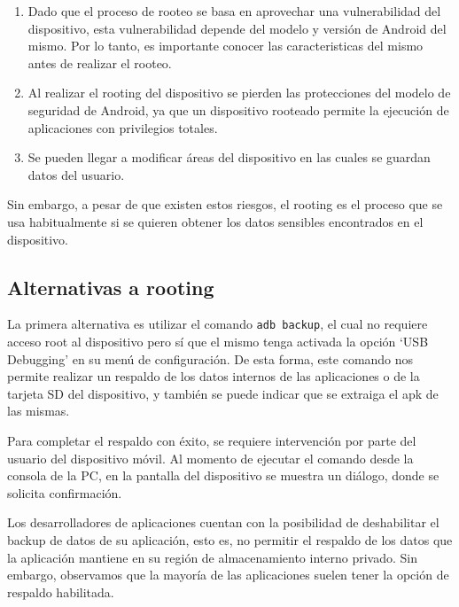 \begin{enumerate}[topsep=0pt, parsep=0pt, partopsep=0pt]
\item Dado que el proceso de rooteo se basa en aprovechar una vulnerabilidad del dispositivo, esta vulnerabilidad depende del modelo y versión de Android del mismo. Por lo tanto, es importante conocer las caracteristicas del mismo antes de realizar el rooteo.
\item Al realizar el rooting del dispositivo se pierden las protecciones del modelo de seguridad de Android, ya que un dispositivo rooteado permite la ejecución de aplicaciones con privilegios totales.
\item Se pueden llegar a modificar áreas del dispositivo en las cuales se guardan datos del usuario.
\end{enumerate}

Sin embargo, a pesar de que existen estos riesgos, el rooting es el proceso que se usa habitualmente si se quieren obtener los datos sensibles encontrados en el dispositivo.

\subsection{Alternativas a rooting}
\label{alternativasRooting}

La primera alternativa es utilizar el comando \texttt{adb backup}, el cual no requiere acceso root al dispositivo pero sí que el mismo tenga activada la opción \enquote*{USB Debugging} en su menú de configuración. De esta forma, este comando nos permite realizar un respaldo de los datos internos de las aplicaciones o de la tarjeta SD del dispositivo, y también se puede indicar que se extraiga el apk de las mismas.

Para completar el respaldo con éxito, se requiere intervención por parte del usuario del dispositivo móvil. Al momento de ejecutar el comando desde la consola de la PC, en la pantalla del dispositivo se muestra un diálogo, donde se solicita confirmación.

Los desarrolladores de aplicaciones cuentan con la posibilidad de deshabilitar el backup de datos de su aplicación, esto es, no permitir el respaldo de los datos que la aplicación mantiene en su región de almacenamiento interno privado. Sin embargo, observamos que la mayoría de las aplicaciones suelen tener la opción de respaldo habilitada.

